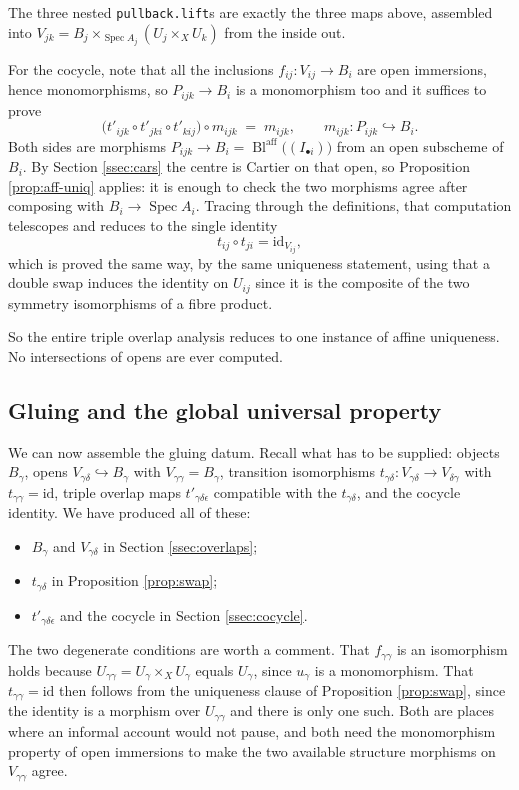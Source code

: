 \documentclass[pdflatex,sn-mathphys-num]{sn-jnl}
\theoremstyle{plain}
\theoremstyle{definition}
\newcommand{\Spec}{\operatorname{Spec}}
\newcommand{\BlM}{\operatorname{Bl}^{\mathrm{aff}}}
\begin{document}
The three nested \texttt{pullback.lift}s are exactly the three maps above,
assembled into $V_{jk} = B_j \times_{\Spec A_j} (U_j \times_X U_k)$ from the
inside out.

For the cocycle, note that all the inclusions $f_{ij} : V_{ij} \to B_i$ are
open immersions, hence monomorphisms, so $P_{ijk} \to B_i$ is a monomorphism
too and it suffices to prove
\[
  \bigl( t'_{ijk} \circ t'_{jki} \circ t'_{kij} \bigr) \circ m_{ijk}
  \;=\; m_{ijk}, \qquad m_{ijk} : P_{ijk} \hookrightarrow B_i .
\]
Both sides are morphisms $P_{ijk} \to B_i = \BlM\bigl((I_{\bullet i})\bigr)$
from an open subscheme of $B_i$. By Section \ref{ssec:cars} the centre is
Cartier on that open, so Proposition \ref{prop:aff-uniq} applies: it is enough
to check the two morphisms agree after composing with
$B_i \to \Spec A_i$. Tracing through the definitions, that computation
telescopes and reduces to the single identity
\[
  t_{ij} \circ t_{ji} = \mathrm{id}_{V_{ij}} ,
\]
which is proved the same way, by the same uniqueness statement, using that a
double swap induces the identity on $U_{ij}$ since it is the composite of the
two symmetry isomorphisms of a fibre product.

So the entire triple overlap analysis reduces to one instance of affine
uniqueness. No intersections of opens are ever computed.

\subsection{Gluing and the global universal property}\label{ssec:global}

We can now assemble the gluing datum. Recall what has to be supplied: objects
$B_\gamma$, opens $V_{\gamma\delta} \hookrightarrow B_\gamma$ with
$V_{\gamma\gamma} = B_\gamma$, transition isomorphisms
$t_{\gamma\delta} : V_{\gamma\delta} \to V_{\delta\gamma}$ with
$t_{\gamma\gamma} = \mathrm{id}$, triple overlap maps
$t'_{\gamma\delta\epsilon}$ compatible with the $t_{\gamma\delta}$, and the
cocycle identity. We have produced all of these:
\begin{itemize}
\item $B_\gamma$ and $V_{\gamma\delta}$ in Section \ref{ssec:overlaps};
\item $t_{\gamma\delta}$ in Proposition \ref{prop:swap};
\item $t'_{\gamma\delta\epsilon}$ and the cocycle in Section
      \ref{ssec:cocycle}.
\end{itemize}
The two degenerate conditions are worth a comment. That $f_{\gamma\gamma}$ is
an isomorphism holds because $U_{\gamma\gamma} = U_\gamma \times_X U_\gamma$
equals $U_\gamma$, since $u_\gamma$ is a monomorphism. That
$t_{\gamma\gamma} = \mathrm{id}$ then follows from the uniqueness clause of
Proposition \ref{prop:swap}, since the identity is a morphism over
$U_{\gamma\gamma}$ and there is only one such. Both are places where an
informal account would not pause, and both need the monomorphism property of
open immersions to make the two available structure morphisms on
$V_{\gamma\gamma}$ agree.
\end{document}
